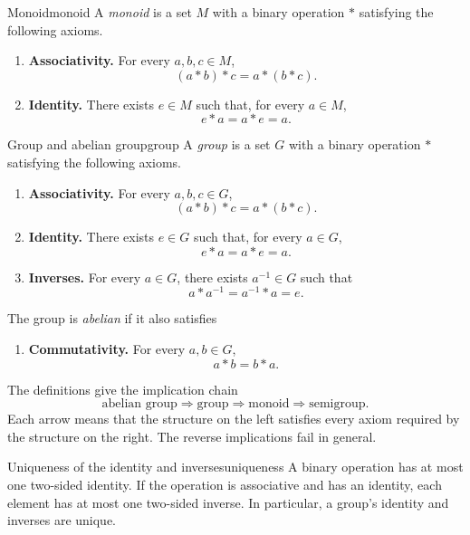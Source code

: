 \documentclass[10pt,a4paper]{article}
\begin{document}
\begin{definition}{Monoid}{monoid}
A \emph{monoid} is a set $M$ with a binary operation $\ast$ satisfying
the following axioms.
\begin{enumerate}[label=\textup{(M\arabic*)}]
  \item \textbf{Associativity.} For every $a,b,c\in M$,
  \[
    (a\ast b)\ast c=a\ast(b\ast c).
  \]

  \item \textbf{Identity.} There exists $e\in M$ such that, for every
  $a\in M$,
  \[
    e\ast a=a\ast e=a.
  \]
\end{enumerate}
\end{definition}

\begin{definition}{Group and abelian group}{group}
A \emph{group} is a set $G$ with a binary operation $\ast$ satisfying
the following axioms.
\begin{enumerate}[label=\textup{(G\arabic*)}]
  \item \textbf{Associativity.} For every $a,b,c\in G$,
  \[
    (a\ast b)\ast c=a\ast(b\ast c).
  \]

  \item \textbf{Identity.} There exists $e\in G$ such that, for every
  $a\in G$,
  \[
    e\ast a=a\ast e=a.
  \]

  \item \textbf{Inverses.} For every $a\in G$, there exists $a^{-1}\in G$
  such that
  \[
    a\ast a^{-1}=a^{-1}\ast a=e.
  \]
\end{enumerate}
The group is \emph{abelian} if it also satisfies
\begin{enumerate}[label=\textup{(G4)},leftmargin=3em]
  \item \textbf{Commutativity.} For every $a,b\in G$,
  \[
    a\ast b=b\ast a.
  \]
\end{enumerate}
\end{definition}

The definitions give the implication chain
\[
  \text{abelian group}
  \Longrightarrow
  \text{group}
  \Longrightarrow
  \text{monoid}
  \Longrightarrow
  \text{semigroup}.
\]
Each arrow means that the structure on the left satisfies every axiom required
by the structure on the right. The reverse implications fail in general.

\begin{proposition}{Uniqueness of the identity and inverses}{uniqueness}
A binary operation has at most one two-sided identity. If the operation is
associative and has an identity, each element has at most one two-sided
inverse. In particular, a group's identity and inverses are unique.
\end{proposition}
\end{document}
